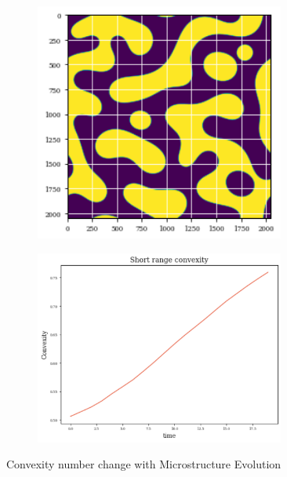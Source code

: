 \documentclass[12pt, a4paper]{report}
\begin{document}
\begin{figure}[H]
\begin{subfigure}{.32\textwidth}
  \label{img:microstrImg}
\end{subfigure}
\begin{subfigure}{.32\textwidth}
  \centering
  \includegraphics[width=0.9\textwidth]{Pictures/MSFeatures/ConvexMicroEvalEnd.png}
  \label{img:microstrImg}
\end{subfigure}
\begin{subfigure}{.5\textwidth}
  \centering
  \includegraphics[width=0.9\textwidth]{Pictures/MSFeatures/ShortRangeConvexityIso.png}
  \label{img:microstrImg}
\end{subfigure}
\caption{Convexity number change with Microstructure Evolution}
\label{fig:test}
\end{figure}
\end{document}

